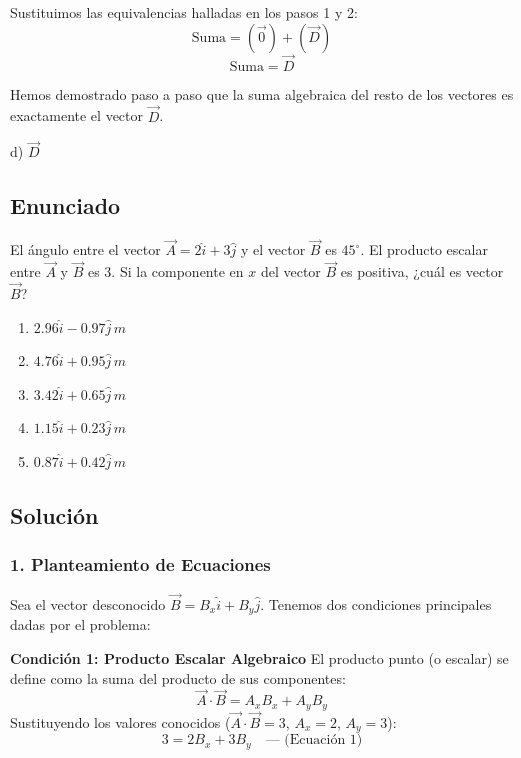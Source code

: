 \documentclass[12pt, a4paper]{article}
\begin{document}
Sustituimos las equivalencias halladas en los pasos 1 y 2:
$$ \text{Suma} = (\vec{0}) + (\vec{D}) $$
$$ \text{Suma} = \vec{D} $$

Hemos demostrado paso a paso que la suma algebraica del resto de los vectores es exactamente el vector $\vec{D}$.

\begin{tcolorbox}[colback=green!5!white, colframe=green!50!black, title=Respuesta Final]
\centering \Large d) $\vec{D}$
\end{tcolorbox}

\newpage

\subsection*{Enunciado}
El ángulo entre el vector $\vec{A} = 2\hat{i} + 3\hat{j}$ y el vector $\vec{B}$ es $45^\circ$. El producto escalar entre $\vec{A}$ y $\vec{B}$ es $3$. Si la componente en $x$ del vector $\vec{B}$ es positiva, ¿cuál es vector $\vec{B}$?

\begin{enumerate}[label=\alph*)]
    \item $2.96\hat{i} - 0.97\hat{j} \, \si{m}$
    \item $4.76\hat{i} + 0.95\hat{j} \, \si{m}$
    \item $3.42\hat{i} + 0.65\hat{j} \, \si{m}$
    \item $1.15\hat{i} + 0.23\hat{j} \, \si{m}$
    \item $0.87\hat{i} + 0.42\hat{j} \, \si{m}$
\end{enumerate}

\subsection*{Solución}

\subsubsection*{1. Planteamiento de Ecuaciones}
Sea el vector desconocido $\vec{B} = B_x\hat{i} + B_y\hat{j}$. Tenemos dos condiciones principales dadas por el problema:

\textbf{Condición 1: Producto Escalar Algebraico}
El producto punto (o escalar) se define como la suma del producto de sus componentes:
$$ \vec{A} \cdot \vec{B} = A_x B_x + A_y B_y $$
Sustituyendo los valores conocidos ($\vec{A} \cdot \vec{B} = 3$, $A_x = 2$, $A_y = 3$):
$$ 3 = 2B_x + 3B_y \quad \text{--- (Ecuación 1)} $$
\end{document}
